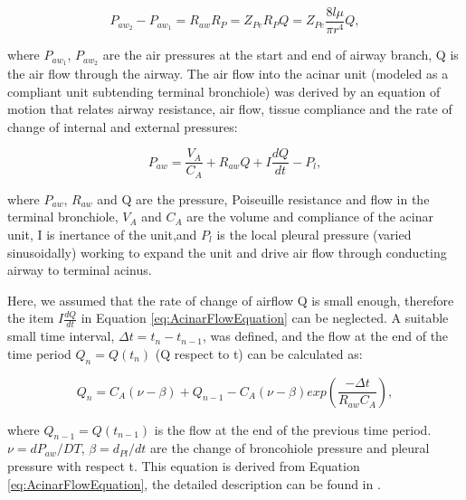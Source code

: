 \begin{equation}
 \label{eq:PressureFlowEquation}
 P_{aw_2} - P_{aw_1} = R_{aw}R_P = Z_{Pe}R_PQ = Z_{Pe}\frac{8l\mu}{\pi r^{4}}Q,
\end{equation}

\noindent where $P_{aw_1}$, $P_{aw_2}$ are the air pressures at the start and end of airway branch, Q is the air flow through the airway. The air flow into the acinar unit (modeled as a compliant unit subtending terminal bronchiole) was derived by an equation of motion that relates airway resistance, air flow, tissue compliance and the rate of change of internal and external pressures:

\begin{equation}
 \label{eq:AcinarFlowEquation}
 P_{aw} = \frac{V_A}{C_A} + R_{aw}Q + I\frac{dQ}{dt} - P_l,
\end{equation}

\noindent where $P_{aw}$, $R_{aw}$ and Q are the pressure, Poiseuille resistance and flow in the terminal bronchiole, $V_A$ and $C_A$ are the volume and compliance of the acinar unit, I is inertance of the unit,and $P_l$ is the local pleural pressure (varied sinusoidally) working to expand the unit and drive air flow through conducting airway to terminal acinus.

Here, we assumed that the rate of change of airflow Q is small enough, therefore the item $I\frac{dQ}{dt}$ in Equation \ref{eq:AcinarFlowEquation} can be neglected. A suitable small time interval, $\Delta t = t_n - t_{n-1}$, was defined, and the flow at the end of the time period $Q_n = Q(t_n)$ (Q respect to t) can be calculated as:

\begin{equation}
 \label{eq:FlowRespectToTime}
 Q_n = C_A(\nu - \beta) + Q_{n-1} - C_A(\nu - \beta)exp(\frac{-\Delta t}{R_{aw}C_A}),
\end{equation}

\noindent where $Q_{n-1} = Q(t_{n-1})$ is the flow at the end of the previous time period. $\nu = dP_{aw}/DT$, $\beta = d_{Pl}/dt$ are the change of broncohiole pressure and pleural pressure with respect t. This equation is derived from Equation \ref{eq:AcinarFlowEquation}, the detailed description can be found in \cite{swan2012computational}.

